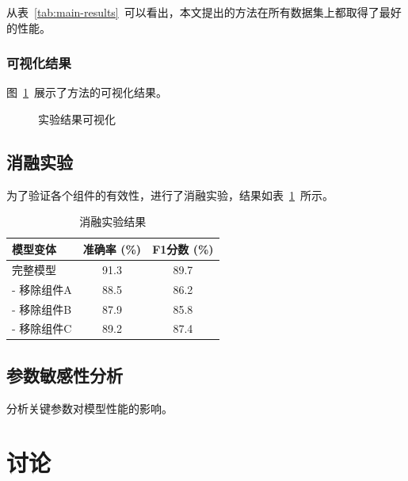 \documentclass[12pt,a4paper]{article}
\begin{document}
从表~\ref{tab:main-results}~可以看出，本文提出的方法在所有数据集上都取得了最好的性能。

\subsubsection{可视化结果}

图~\ref{fig:results}~展示了方法的可视化结果。

\begin{figure}[htbp]
    \centering
    
    
    \caption{实验结果可视化}
    \label{fig:results}
\end{figure}

\subsection{消融实验}

为了验证各个组件的有效性，进行了消融实验，结果如表~\ref{tab:ablation}~所示。

\begin{table}[htbp]
    \centering
    \caption{消融实验结果}
    \label{tab:ablation}
    \begin{tabular}{lcc}
        \toprule
        \textbf{模型变体} & \textbf{准确率 (\%)} & \textbf{F1分数 (\%)} \\
        \midrule
        完整模型 & 91.3 & 89.7 \\
        - 移除组件A & 88.5 & 86.2 \\
        - 移除组件B & 87.9 & 85.8 \\
        - 移除组件C & 89.2 & 87.4 \\
        \bottomrule
    \end{tabular}
\end{table}

\subsection{参数敏感性分析}

分析关键参数对模型性能的影响。

\section{讨论}
\end{document}

